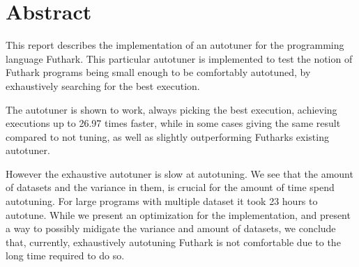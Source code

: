 \section*{Abstract}
This report describes the implementation of an autotuner for the programming language Futhark. This particular autotuner is implemented to test the notion of Futhark programs being small enough to be comfortably autotuned, by exhaustively searching for the best execution. 

The autotuner is shown to work, always picking the best execution, achieving executions up to 26.97 times faster, while in some cases giving the same result compared to not tuning, as well as slightly outperforming Futharks existing autotuner. 

However the exhaustive autotuner is slow at autotuning. We see that the amount of datasets and the variance in them, is crucial for the amount of time spend autotuning. For large programs with multiple dataset it took 23 hours to autotune. While we present an optimization for the implementation, and present a way to possibly midigate the variance and amount of datasets, we conclude that, currently, exhaustively autotuning Futhark is not comfortable due to the long time required to do so.